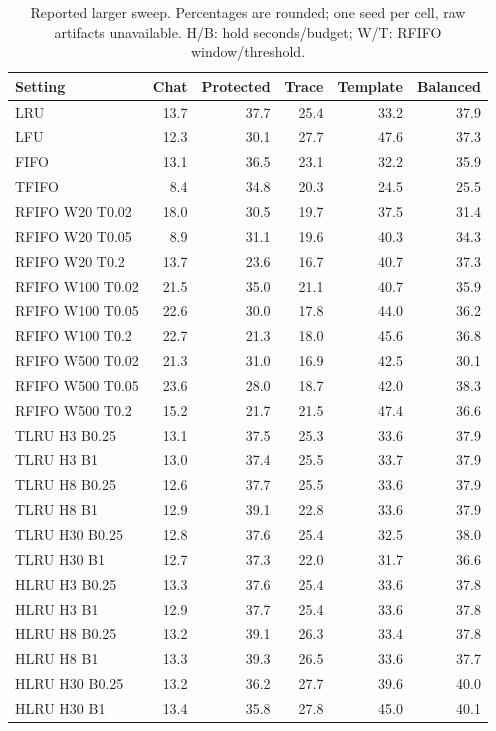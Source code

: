 \documentclass{article}
\begin{document}
\begin{table}[t]\centering\small\caption{Reported larger sweep. Percentages are rounded; one seed per cell, raw artifacts unavailable. H/B: hold seconds/budget; W/T: RFIFO window/threshold.}\begin{tabular}{lrrrrr}\toprule Setting & Chat & Protected & Trace & Template & Balanced\\\midrule
LRU & 13.7 & 37.7 & 25.4 & 33.2 & 37.9\\
LFU & 12.3 & 30.1 & 27.7 & 47.6 & 37.3\\
FIFO & 13.1 & 36.5 & 23.1 & 32.2 & 35.9\\
TFIFO & 8.4 & 34.8 & 20.3 & 24.5 & 25.5\\
RFIFO W20 T0.02 & 18.0 & 30.5 & 19.7 & 37.5 & 31.4\\
RFIFO W20 T0.05 & 8.9 & 31.1 & 19.6 & 40.3 & 34.3\\
RFIFO W20 T0.2 & 13.7 & 23.6 & 16.7 & 40.7 & 37.3\\
RFIFO W100 T0.02 & 21.5 & 35.0 & 21.1 & 40.7 & 35.9\\
RFIFO W100 T0.05 & 22.6 & 30.0 & 17.8 & 44.0 & 36.2\\
RFIFO W100 T0.2 & 22.7 & 21.3 & 18.0 & 45.6 & 36.8\\
RFIFO W500 T0.02 & 21.3 & 31.0 & 16.9 & 42.5 & 30.1\\
RFIFO W500 T0.05 & 23.6 & 28.0 & 18.7 & 42.0 & 38.3\\
RFIFO W500 T0.2 & 15.2 & 21.7 & 21.5 & 47.4 & 36.6\\
TLRU H3 B0.25 & 13.1 & 37.5 & 25.3 & 33.6 & 37.9\\
TLRU H3 B1 & 13.0 & 37.4 & 25.5 & 33.7 & 37.9\\
TLRU H8 B0.25 & 12.6 & 37.7 & 25.5 & 33.6 & 37.9\\
TLRU H8 B1 & 12.9 & 39.1 & 22.8 & 33.6 & 37.9\\
TLRU H30 B0.25 & 12.8 & 37.6 & 25.4 & 32.5 & 38.0\\
TLRU H30 B1 & 12.7 & 37.3 & 22.0 & 31.7 & 36.6\\
HLRU H3 B0.25 & 13.3 & 37.6 & 25.4 & 33.6 & 37.8\\
HLRU H3 B1 & 12.9 & 37.7 & 25.4 & 33.6 & 37.8\\
HLRU H8 B0.25 & 13.2 & 39.1 & 26.3 & 33.4 & 37.8\\
HLRU H8 B1 & 13.3 & 39.3 & 26.5 & 33.6 & 37.7\\
HLRU H30 B0.25 & 13.2 & 36.2 & 27.7 & 39.6 & 40.0\\
HLRU H30 B1 & 13.4 & 35.8 & 27.8 & 45.0 & 40.1\\
\bottomrule\end{tabular}\end{table}
\end{document}
